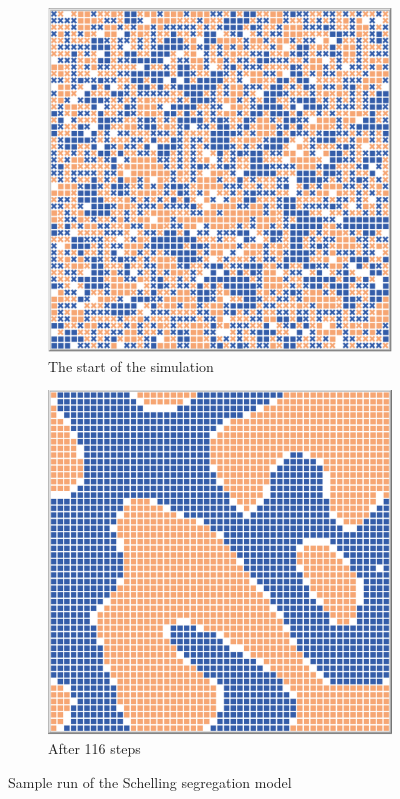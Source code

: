 \documentclass[review]{elsarticle}
\begin{document}
\begin{figure}
    \centering
    \begin{subfigure}[b]{0.4\textwidth}
        \includegraphics[width=\textwidth]{schelling1.png}
        \caption{The start of the simulation}
        \label{fig:schelling1}
    \end{subfigure}
    \quad
    \begin{subfigure}[b]{0.4\textwidth}
        \includegraphics[width=\textwidth]{schelling2.png}
        \caption{After 116 steps}
        \label{fig:schelling2}
    \end{subfigure}
    \caption{Sample run of the Schelling segregation model}\label{fig:schelling}
\end{figure}
\end{document}
